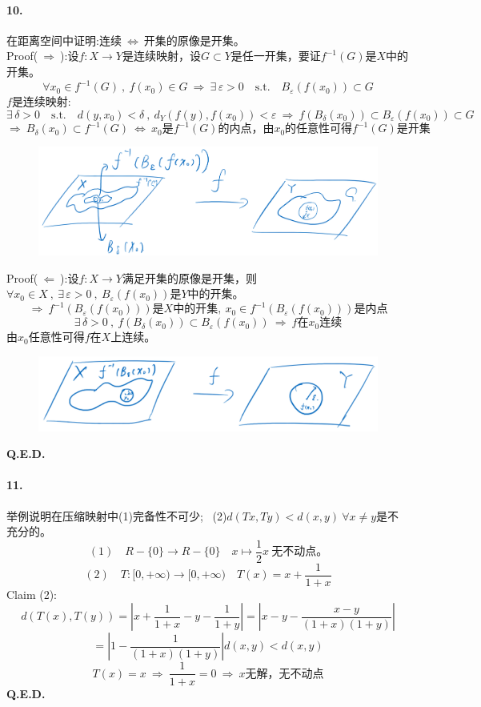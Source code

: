 \paragraph*{10.}在距离空间中证明:连续$\ \Leftrightarrow \ $开集的原像是开集。\\
Proof($\ \Rightarrow \ $):设$f:X \to Y$是连续映射，设$G \subset Y$是任一开集，要证$f^{-1}(G)$是$X$中的开集。
\[\forall x_0 \in f^{-1}(G) \ , \ f(x_0) \in G \ \Rightarrow \ \exists \, \varepsilon>0 \quad \text{s.t.} \quad B_{\varepsilon}(f(x_0)) \subset G\]
$f$是连续映射:
\[\exists \, \delta>0 \quad \text{s.t.} \quad d(y,x_0)<\delta \ , \ d_Y(f(y),f(x_0))<\varepsilon \ \Rightarrow \ f(B_{\delta}(x_0)) \subset B_{\varepsilon}(f(x_0)) \subset G\]
\[\Rightarrow \ B_{\delta}(x_0) \subset f^{-1}(G) \ \Leftrightarrow \ x_0\text{是}f^{-1}(G)\text{的内点，由}x_0\text{的任意性可得}f^{-1}(G)\text{是开集}\]
\begin{figure}[htbp]
    \center
    \includegraphics[scale=0.2]{./fig/ex-2.png}
\end{figure}
Proof($\ \Leftarrow \ $):设$f:X \to Y$满足开集的原像是开集，则$\forall x_0 \in X \ , \ \exists \, \varepsilon>0 \ , \ B_{\varepsilon}(f(x_0))$是$Y$中的开集。
\[\Rightarrow \ f^{-1}(B_{\varepsilon}(f(x_0)))\text{是$X$中的开集}, \ x_0 \in f^{-1}(B_{\varepsilon}(f(x_0)))\text{是内点}\]
\[\exists \, \delta>0 \ , \ f(B_{\delta}(x_0)) \subset B_{\varepsilon}(f(x_0)) \ \Rightarrow \ f\text{在}x_0\text{连续}\]
由$x_0$任意性可得$f$在$X$上连续。
\begin{figure}[htbp]
    \center
    \includegraphics[scale=0.2]{./fig/ex-3.png}
\end{figure}
\textbf{Q.E.D.}

\paragraph*{11.}举例说明在压缩映射中(1)完备性不可少; \ (2)$d(Tx,Ty)<d(x,y) \ \forall x \neq y$是不充分的。
\[(1) \quad R-\{0\} \to R-\{0\} \quad x \mapsto \frac{1}{2}x \ \text{无不动点。}\]
\[(2) \quad T:[0,+\infty) \to [0,+\infty) \quad T(x)=x+\frac{1}{1+x}\]
Claim (2):
\[d(T(x),T(y))=\left|x+\frac{1}{1+x}-y-\frac{1}{1+y}\right|=\left|x-y-\frac{x-y}{(1+x)(1+y)}\right|\]
\[=\left|1-\frac{1}{(1+x)(1+y)}\right|d(x,y)<d(x,y)\]
\[T(x)=x \ \Rightarrow \ \frac{1}{1+x}=0 \ \Rightarrow \ x\text{无解，无不动点}\]
\textbf{Q.E.D.}

